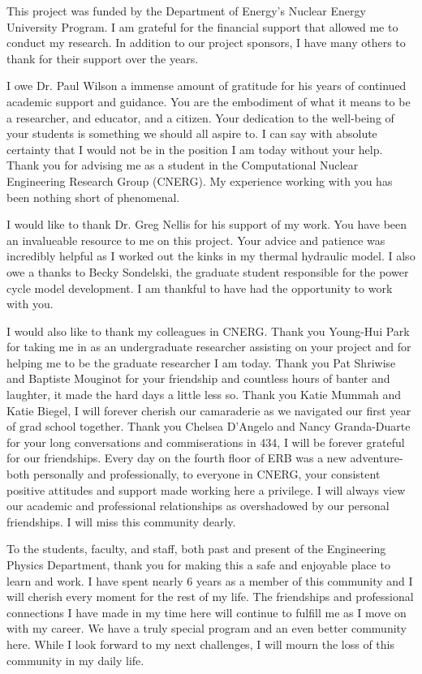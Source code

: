 This project was funded by the Department of Energy's Nuclear Energy University
Program. I am grateful for the financial support that allowed me to conduct my
research. In addition to our project sponsors, I have many others to thank for their
support over the years.

I owe Dr. Paul Wilson a immense amount of gratitude for his years of continued
academic support and guidance. You are the embodiment of what it means to be
a researcher, and educator, and a citizen. Your dedication to the well-being of your
students is something we should all aspire to. I can say with absolute
certainty that I would not be in the position I am today without your help. 
Thank you for advising me as a student in the Computational Nuclear Engineering 
Research Group (CNERG). My experience working with you has been nothing short of phenomenal.

I would like to thank Dr. Greg Nellis for his support of my work. You have
been an invalueable resource to me on this project. Your advice and patience was
incredibly helpful as I worked out the kinks in my thermal hydraulic model. I
also owe a thanks to Becky Sondelski, the graduate student responsible for the
power cycle model development. I am thankful to have had the opportunity to work with you.

I would also like to thank my colleagues in CNERG. Thank you Young-Hui Park 
for taking me in as an undergraduate researcher assisting on your project
and for helping me to be the graduate researcher I am today. Thank you
Pat Shriwise and Baptiste Mouginot for your friendship and countless hours of
banter and laughter, it made the hard days a little less so. Thank you Katie
Mummah and Katie Biegel, I will forever cherish our camaraderie as we navigated
our first year of grad school together. Thank you Chelsea D'Angelo and Nancy
Granda-Duarte for your long conversations and commiserations in 434, I will be
forever grateful for our friendships. Every day on the fourth floor of ERB 
was a new adventure-both personally and professionally, to everyone in CNERG,
your consistent positive attitudes and support made working here a privilege. I
will always view our academic and professional relationships as overshadowed by
our personal friendships. I will miss this community dearly.

To the students, faculty, and staff, both past and present of the Engineering
Physics Department, thank you for making this a safe and enjoyable place to
learn and work. I have spent nearly 6 years as a member of this community and I
will cherish every moment for the rest of my life. The friendships and
professional connections I have made in my time here will continue to fulfill me
as I move on with my career. We have a truly special program and
an even better community here. While I look forward to my next challenges, 
I will mourn the loss of this community in my daily life.


